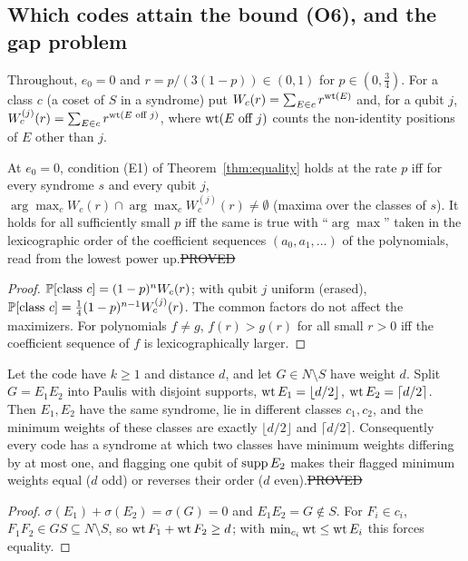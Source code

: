 \subsection{Which codes attain the bound (O6), and the gap problem}\label{sec:o6-gap}

Throughout, $e_0=0$ and $r=p/(3(1-p))\in(0,1)$ for $p\in(0,\tfrac34)$. For a class $c$ (a coset of $S$ in a syndrome) put $W_c(r)=\sum_{E\in c}r^{\operatorname{wt}(E)}$ and, for a qubit $j$, $W^{(j)}_c(r)=\sum_{E\in c}r^{\operatorname{wt}(E\text{ off }j)}$, where $\operatorname{wt}(E\text{ off }j)$ counts the non-identity positions of $E$ other than $j$.

\begin{proposition}\label{prop:lex}
At $e_0=0$, condition (E1) of Theorem~\ref{thm:equality} holds at the rate $p$ iff for every syndrome $s$ and every qubit $j$, $\arg\max_cW_c(r)\cap\arg\max_cW^{(j)}_c(r)\ne\emptyset$ (maxima over the classes of $s$). It holds for all sufficiently small $p$ iff the same is true with ``$\arg\max$'' taken in the lexicographic order of the coefficient sequences $(a_0,a_1,\dots)$ of the polynomials, read from the lowest power up.\hfill\st{PROVED}
\end{proposition}
\begin{proof}
$\mathbb{P}[\text{class }c]=(1-p)^nW_c(r)$; with qubit $j$ uniform (erased), $\mathbb{P}[\text{class }c]=\tfrac14(1-p)^{n-1}W^{(j)}_c(r)$. The common factors do not affect the maximizers. For polynomials $f\ne g$, $f(r)>g(r)$ for all small $r>0$ iff the coefficient sequence of $f$ is lexicographically larger.
\end{proof}

\begin{lemma}\label{lem:split}
Let the code have $k\ge1$ and distance $d$, and let $G\in N\setminus S$ have weight $d$. Split $G=E_1E_2$ into Paulis with disjoint supports, $\operatorname{wt} E_1=\lfloor d/2\rfloor$, $\operatorname{wt} E_2=\lceil d/2\rceil$. Then $E_1,E_2$ have the same syndrome, lie in different classes $c_1,c_2$, and the minimum weights of these classes are exactly $\lfloor d/2\rfloor$ and $\lceil d/2\rceil$. Consequently every code has a syndrome at which two classes have minimum weights differing by at most one, and flagging one qubit of $\operatorname{supp} E_2$ makes their flagged minimum weights equal ($d$ odd) or reverses their order ($d$ even).\hfill\st{PROVED}
\end{lemma}
\begin{proof}
$\sigma(E_1)+\sigma(E_2)=\sigma(G)=0$ and $E_1E_2=G\notin S$. For $F_i\in c_i$, $F_1F_2\in GS\subseteq N\setminus S$, so $\operatorname{wt} F_1+\operatorname{wt} F_2\ge d$; with $\min_{c_i}\operatorname{wt}\le\operatorname{wt} E_i$ this forces equality.
\end{proof}

